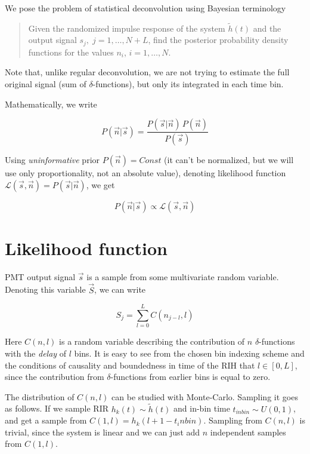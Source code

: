 We pose the problem of statistical deconvolution using Bayesian terminology

\begin{quote}
	Given the randomized impulse response of the system $\tilde{h}(t)$ and the output signal $s_j, \; j = 1, \ldots, N + L$, find the posterior probability density functions for the values $n_i$, $i = 1, \ldots, N$.
\end{quote}

Note that, unlike regular deconvolution, we are not trying to estimate the full original signal (sum of $\delta$-functions), but only its integrated in each time bin.

Mathematically, we write

\begin{equation}
	P(\vec{n} | \vec{s}) = \frac{P(\vec{s} | \vec{n}) \, P(\vec{n})}{P(\vec{s})}
\end{equation}

Using \textit{uninformative} prior $P(\vec{n}) = Const$ (it can't be normalized, but we will use only proportionality, not an absolute value), denoting likelihood function $\mathcal{L}(\vec{s}, \vec{n}) = P(\vec{s} | \vec{n})$, we get

\begin{equation}
	\label{eq:bayes-theorem-adapted}
	P(\vec{n} | \vec{s}) \propto \mathcal{L}(\vec{s}, \vec{n})
\end{equation}

\section{Likelihood function}
\label{sec:naive-monte-carlo-likelihood}

PMT output signal $\vec{s}$ is a sample from some multivariate random variable. Denoting this variable $\vec{S}$, we can write

\begin{equation}
	S_j = \sum_{l=0}^{L} C(n_{j-l}, l)
	\label{eq:S-definition-as-random-variable}
\end{equation}

Here $C(n, l)$ is a random variable describing the contribution of $n$ $\delta$-functions with the \textit{delay} of $l$ bins. It is easy to see from the chosen bin indexing scheme and the conditions of causality and boundedness in time of the RIH that $l \in \left[0, L\right]$, since the contribution from $\delta$-functions from earlier bins is equal to zero.

The distribution of $C(n, l)$ can be studied with Monte-Carlo. Sampling it goes as follows. If we sample RIR $h_k(t) \sim \tilde{h}(t)$ and in-bin time $t_{inbin} \sim U(0, 1)$, and get a sample from $C(1, l) = h_k(l + 1 - t_inbin)$. Sampling from $C(n, l)$ is trivial, since the system is linear and we can just add $n$ independent samples from $C(1, l)$.

